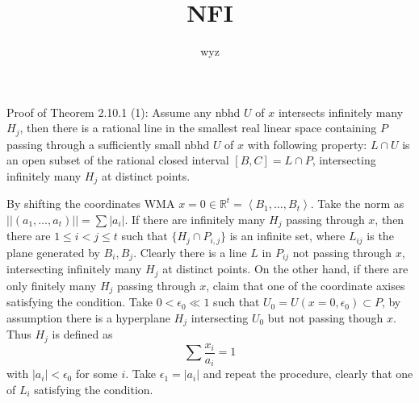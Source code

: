 \documentclass{article}
\title{NFI }
\author{wyz}
\date{}
\begin{document}
Proof of Theorem 2.10.1 (1): Assume any nbhd $ U $ of $ x $ intersects infinitely many $ H_j $, then there is a rational line in the smallest real linear space containing $ P $ passing through a sufficiently small nbhd $ U  $ of $ x $ with following property: $ L\cap U $  is an open subset of the rational closed interval $ [B,C]=L\cap P $, intersecting infinitely many $ H_j $ at distinct points.

By  shifting the coordinates WMA $ x=0\in \mathbb{R}^t=\left<B_1,\ldots,B_t\right> $. Take the norm as $ ||(a_1,\ldots,a_t)||=\sum |a_i| $. If there are infinitely many $ H_j $ passing through $ x $, then there are $ 1\leqslant i<j\leqslant t $ such that $ \{H_j\cap P_{i,j}\} $ is an infinite set, where $ L_{ij} $ is the plane generated by $ B_i,B_j $. Clearly there is a line $ L $ in $ P_{ij} $ not passing through $ x $, intersecting infinitely many $ H_j $  at distinct points. On the other hand, if there are only finitely many $ H_j $ passing through $ x $, claim that one of the coordinate axises satisfying the condition. Take $ 0<\epsilon_0\ll 1 $ such that $ U_0=U(x=0,\epsilon_0)\subset P $, by assumption there is a hyperplane $ H_j $ intersecting $ U_0 $  but not passing though $ x $. Thus $ H_j $ is defined as
$$ \sum\frac{x_i}{a_i}=1 $$
with $ |a_i|<\epsilon_0 $ for some $ i $. Take $ \epsilon_1=|a_i| $ and repeat the procedure, clearly that one of $ L_i $ satisfying the condition.

	
\end{document}
